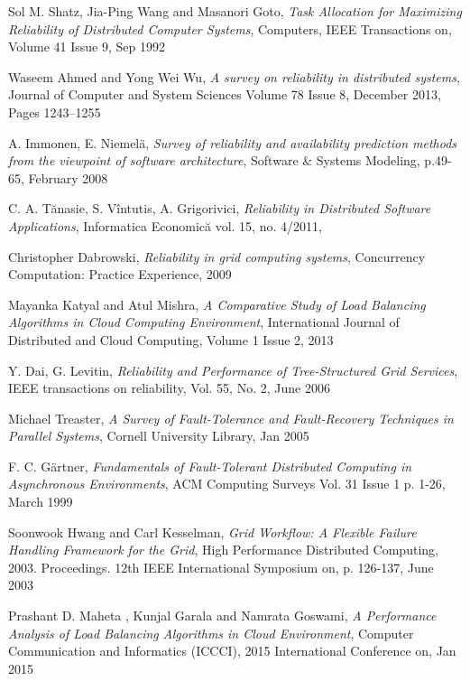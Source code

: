 \documentclass{cslthse-msc}
\begin{document}
\begin{thebibliography}{50}

	Sol M. Shatz, Jia-Ping Wang and Masanori Goto,
	\emph{Task Allocation for Maximizing Reliability of Distributed Computer Systems},
	Computers, IEEE Transactions on, Volume 41 Issue 9,
	Sep 1992
	
	Waseem Ahmed and Yong Wei Wu,
	\emph{A survey on reliability in distributed systems},
	Journal of Computer and System Sciences Volume 78 Issue 8,
	December 2013, Pages 1243–1255
	
	A. Immonen, E. Niemelä,
	\emph{Survey of reliability and availability prediction methods from the viewpoint of software architecture},
	Software \& Systems Modeling, p.49-65,
	February 2008

	C. A. Tănasie, S. Vîntutis, A. Grigorivici,
	\emph{Reliability in Distributed Software Applications},
	Informatica Economică vol. 15, no. 4/2011,

	Christopher Dabrowski,
	\emph{Reliability in grid computing systems},
	Concurrency Computation: Practice Experience,
	2009

	Mayanka Katyal and Atul Mishra,
	\emph{A Comparative Study of Load Balancing Algorithms in Cloud Computing Environment},
	International Journal of Distributed and Cloud Computing, Volume 1 Issue 2,
	2013
	
	Y. Dai, G. Levitin,
	\emph{Reliability and Performance of Tree-Structured Grid Services},
	IEEE transactions on reliability, Vol. 55, No. 2, 
	June 2006

	Michael Treaster,
	\emph{A Survey of Fault-Tolerance and Fault-Recovery Techniques in Parallel Systems},
	Cornell University Library,
	Jan 2005

	F. C. Gärtner,
	\emph{Fundamentals of Fault-Tolerant Distributed Computing in Asynchronous Environments},
	ACM Computing Surveys Vol. 31 Issue 1 p. 1-26, 
	March 1999 

	Soonwook Hwang and Carl Kesselman,
	\emph{Grid Workflow: A Flexible Failure Handling Framework for the Grid},
	High Performance Distributed Computing, 2003. Proceedings. 12th IEEE International Symposium on, p. 	126-137, 
	June 2003

	Prashant D. Maheta , Kunjal Garala and Namrata Goswami,
	\emph{A Performance Analysis of Load Balancing Algorithms in Cloud Environment},
	Computer Communication and Informatics (ICCCI), 2015 International Conference on,
	Jan 2015
	

\end{thebibliography}
\end{document}
